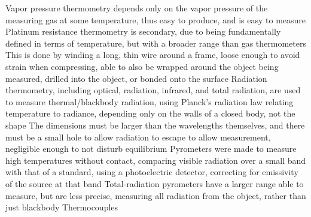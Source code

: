 \documentclass[11 pt, twoside]{article}
\newenvironment{outline*}
{
	\begin{outline}[enumerate]
	}
	{\end{outline}
}
\begin{document}
\begin{outline*}
\1 Vapor pressure thermometry depends only on the vapor pressure of the measuring gas at some temperature, thus easy to produce, and is easy to measure
\1 Platinum resistance thermometry is secondary, due to being fundamentally defined in terms of temperature, but with a broader range than gas thermometers
\2 This is done by winding a long, thin wire around a frame, loose enough to avoid strain when compressing, able to also be wrapped around the object being measured, drilled into the object, or bonded onto the surface
\2
\1 Radiation thermometry, including optical, radiation, infrared, and total radiation, are used to measure thermal/blackbody radiation, using Planck's radiation law relating temperature to radiance, depending only on the walls of a closed body, not the shape
\2 The dimensions must be larger than the wavelengths themselves, and there must be a small hole to allow radiation to escape to allow measurement, negligible enough to not disturb equilibrium
\2 Pyrometers were made to measure high temperatures without contact, comparing visible radiation over a small band with that of a standard, using a photoelectric detector, correcting for emissivity of the source at that band
\2 Total-radiation pyrometers have a larger range able to measure, but are less precise, measuring all radiation from the object, rather than just blackbody
\1 Thermocouples
\2 
\end{outline*}
\end{document}
